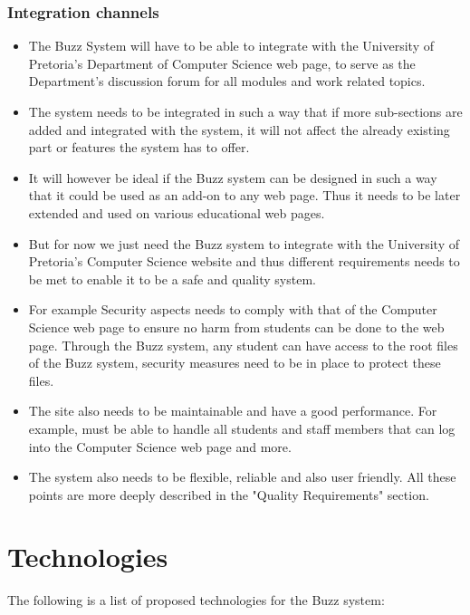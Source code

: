 \documentclass[a4paper]{article}
\begin{document}
\subsubsection{Integration channels }
\begin{itemize}
\item The Buzz System will have to be able to integrate with the University of Pretoria's Department of Computer Science web page, to serve as the Department's discussion forum for all modules and work related topics.  
\item The system needs to be integrated in such a way that if more sub-sections are added and integrated with the system, it will not affect the already existing part or features the system has to offer. 
\item It will however be ideal if the Buzz system can be designed in such a way that it could be used as an add-on to any web page. Thus it needs to be later extended and used on various educational web pages.
\item But for now we just need the Buzz system to integrate with the  University of Pretoria's Computer Science website and thus different requirements needs to be met to enable it to be a safe and quality system. 
\item For example Security aspects needs to comply with that of the Computer Science web page to ensure no harm from students can be done to the web page. Through the Buzz system, any student can have access to the root files of the Buzz system, security measures need to be in place to protect these files.
\item The site also needs to be maintainable and  have a good performance. For example, must be able to handle all students and staff members that can log into the Computer Science web page and more.
\item The system also needs to be flexible, reliable and also user friendly. All these points are more deeply described in the "Quality Requirements" section.
\end{itemize}

\section{Technologies}

The following is a list of proposed technologies for the Buzz system:
\end{document}
